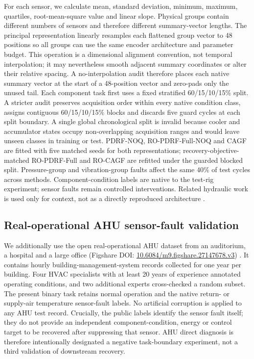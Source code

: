\documentclass[11pt]{article}
\begin{document}
For each sensor, we calculate mean, standard deviation, minimum, maximum, quartiles, root-mean-square value and linear slope. Physical groups contain different numbers of sensors and therefore different summary-vector lengths. The principal representation linearly resamples each flattened group vector to 48 positions so all groups can use the same encoder architecture and parameter budget. This operation is a dimensional alignment convention, not temporal interpolation; it may nevertheless smooth adjacent summary coordinates or alter their relative spacing. A no-interpolation audit therefore places each native summary vector at the start of a 48-position vector and zero-pads only the unused tail. Each component task first uses a fixed stratified 60/15/10/15\% split. A stricter audit preserves acquisition order within every native condition class, assigns contiguous 60/15/10/15\% blocks and discards five guard cycles at each split boundary. A single global chronological split is invalid because cooler and accumulator states occupy non-overlapping acquisition ranges and would leave unseen classes in training or test. PDRF-NOQ, RO-PDRF-Full-NOQ and CAGF are fitted with five matched seeds for both representations; recovery-objective-matched RO-PDRF-Full and RO-CAGF are refitted under the guarded blocked split. Pressure-group and vibration-group faults affect the same 40\% of test cycles across methods. Component-condition labels are native to the test-rig experiment; sensor faults remain controlled interventions. Related hydraulic work is used only for context, not as a directly reproduced architecture \citep{ma2021multirate,keleko2023hydraulic,yildirim2025hydraulic}.

\subsection{Real-operational AHU sensor-fault validation}

We additionally use the open real-operational AHU dataset from an auditorium, a hospital and a large office (Figshare DOI: \href{https://doi.org/10.6084/m9.figshare.27147678.v3}{10.6084/m9.figshare.27147678.v3}) \citep{wang2025ahuoperational,wang2024ahudataset}. It contains hourly building-management-system records collected for one year per building. Four HVAC specialists with at least 20 years of experience annotated operating conditions, and two additional experts cross-checked a random subset. The present binary task retains normal operation and the native return- or supply-air temperature sensor-fault labels. No artificial corruption is applied to any AHU test record. Crucially, the public labels identify the sensor fault itself; they do not provide an independent component-condition, energy or control target to be recovered after suppressing that sensor. AHU direct diagnosis is therefore intentionally designated a negative task-boundary experiment, not a third validation of downstream recovery.
\end{document}
